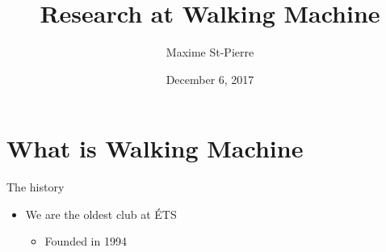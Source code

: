 \documentclass{beamer}
\title{Research at Walking Machine}
\date{December 6, 2017}
\author{Maxime St-Pierre}
\institute{Walking Machine - École de Technologie Supérieure}
\begin{document}
  \maketitle
  \section{What is Walking Machine}
  \begin{frame}{The history}
  	\begin{itemize}
  		\item We are the oldest club at ÉTS
  		\begin{itemize}
  			\item Founded in 1994
  		\end{itemize}
  	\end{itemize}
  \end{frame}
\end{document}
